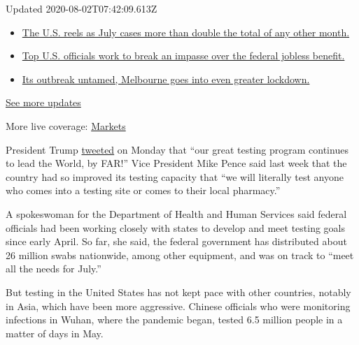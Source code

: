 Updated 2020-08-02T07:42:09.613Z

\begin{itemize}
\tightlist
\item
  \href{https://www.nytimes.com/2020/08/01/world/coronavirus-covid-19.html?action=click\&pgtype=Article\&state=default\&region=MAIN_CONTENT_1\&context=storylines_live_updates\#link-34047410}{The
  U.S. reels as July cases more than double the total of any other
  month.}
\item
  \href{https://www.nytimes.com/2020/08/01/world/coronavirus-covid-19.html?action=click\&pgtype=Article\&state=default\&region=MAIN_CONTENT_1\&context=storylines_live_updates\#link-780ec966}{Top
  U.S. officials work to break an impasse over the federal jobless
  benefit.}
\item
  \href{https://www.nytimes.com/2020/08/01/world/coronavirus-covid-19.html?action=click\&pgtype=Article\&state=default\&region=MAIN_CONTENT_1\&context=storylines_live_updates\#link-2bc8948}{Its
  outbreak untamed, Melbourne goes into even greater lockdown.}
\end{itemize}

\href{https://www.nytimes.com/2020/08/01/world/coronavirus-covid-19.html?action=click\&pgtype=Article\&state=default\&region=MAIN_CONTENT_1\&context=storylines_live_updates}{See
more updates}

More live coverage:
\href{https://www.nytimes.com/live/2020/07/31/business/stock-market-today-coronavirus?action=click\&pgtype=Article\&state=default\&region=MAIN_CONTENT_1\&context=storylines_live_updates}{Markets}

President Trump
\href{https://twitter.com/realDonaldTrump/status/1280205902742781958?s=20}{tweeted}
on Monday that ``our great testing program continues to lead the World,
by FAR!'' Vice President Mike Pence said last week that the country had
so improved its testing capacity that ``we will literally test anyone
who comes into a testing site or comes to their local pharmacy.''

A spokeswoman for the Department of Health and Human Services said
federal officials had been working closely with states to develop and
meet testing goals since early April. So far, she said, the federal
government has distributed about 26 million swabs nationwide, among
other equipment, and was on track to ``meet all the needs for July.''

But testing in the United States has not kept pace with other countries,
notably in Asia, which have been more aggressive. Chinese officials who
were monitoring infections in Wuhan, where the pandemic began, tested
6.5 million people in a matter of days in May.

